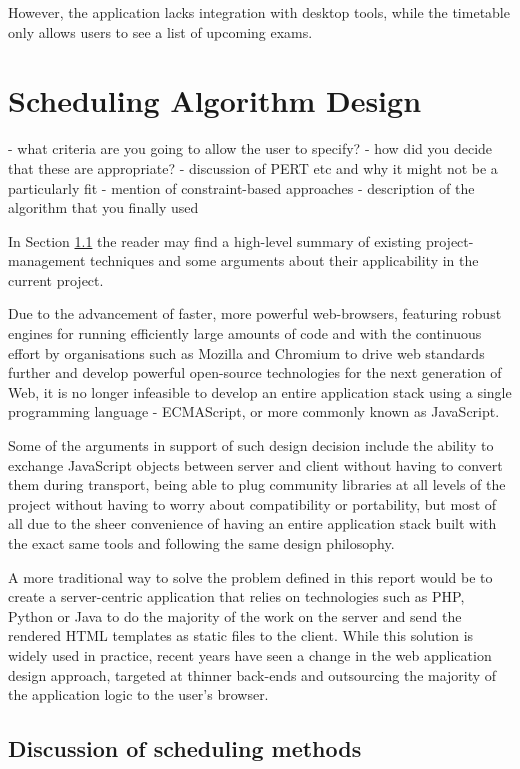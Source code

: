 \documentclass[bsc,frontabs,twoside,singlespacing,parskip]{infthesis}     %
\begin{document}
		However, the application lacks integration with desktop tools, while the timetable only allows users to see a list of upcoming exams.




\chapter{Scheduling Algorithm Design}

	- what criteria are you going to allow the user to specify?
	- how did you decide that these are appropriate?
	- discussion of PERT etc and why it might not be a particularly fit
	- mention of constraint-based approaches
	- description of the algorithm that you finally used

	In Section \ref{scheduling} the reader may find a high-level summary of existing project-management techniques and some arguments about their applicability in the current project.

	Due to the advancement of faster, more powerful web-browsers, featuring robust engines for running efficiently large amounts of  code and with the continuous effort by organisations such as Mozilla and Chromium to drive web standards further and develop powerful open-source technologies for the next generation of Web, it is no longer infeasible to develop an entire application stack using a single programming language - ECMAScript, or more commonly known as JavaScript.

	Some of the arguments in support of such design decision include the ability to exchange JavaScript objects between server and client without having to convert them during transport, being able to plug community libraries at all levels of the project without having to worry about compatibility or portability, but most of all due to the sheer convenience of having an entire application stack built with the exact same tools and following the same design philosophy.

	A more traditional way to solve the problem defined in this report would be to create a server-centric application that relies on technologies such as PHP, Python or Java to do the majority of the work on the server and send the rendered HTML templates as static files to the client. While this solution is widely used in practice, recent years have seen a change in the web application design approach, targeted at thinner back-ends and outsourcing the majority of the application logic to the user's browser.

	\section{Discussion of scheduling methods}\label{scheduling}
\end{document}
